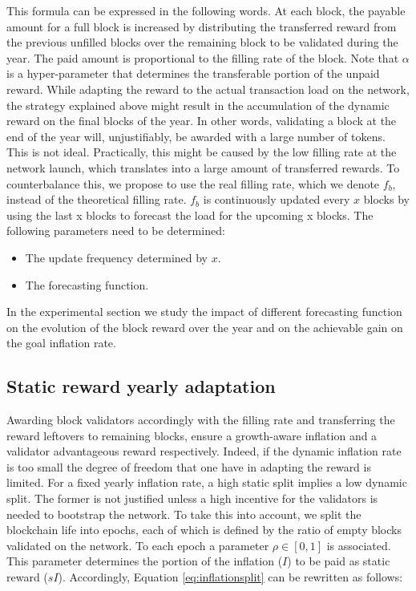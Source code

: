 \documentclass[conference]{IEEEtran}
\begin{document}
This formula can be expressed in the following words. At each block, the payable amount for a full block is increased by distributing the transferred reward from the previous unfilled blocks over the remaining block to be validated during the year. The paid amount is proportional to the filling rate of the block. Note that $\alpha$ is a hyper-parameter that determines the transferable portion of the unpaid reward. While adapting the reward to the actual transaction load on the network, the strategy explained above might result in the accumulation of the dynamic reward on the final blocks of the year. In other words, validating a block at the end of the year will, unjustifiably, be awarded with a large number of tokens. This is not ideal. Practically, this might be caused by the low filling rate at the network launch, which translates into a large amount of transferred rewards. To counterbalance this, we propose to use the real filling rate, which we denote $f_b$, instead of the theoretical filling rate. $f_b$ is continuously updated every $x$ blocks by using the last x blocks to forecast the load for the upcoming x blocks. The following parameters need to be determined:

\begin{itemize}
	\item The update frequency determined by $x$.
	\item The forecasting function.
\end{itemize}

In the experimental section we study the impact of different forecasting function on the evolution of the block reward over the year and on the achievable gain on the goal inflation rate.

\subsection{Static reward yearly adaptation}
Awarding block validators accordingly with the filling rate and transferring the reward leftovers to remaining blocks, ensure a growth-aware inflation and a validator advantageous reward respectively. Indeed, if the dynamic inflation rate is too small the degree of freedom that one have in adapting the reward is limited. For a fixed yearly inflation rate, a high static split implies a low dynamic split. The former is not justified unless a high incentive for the validators is needed to bootstrap the network. To take this into account, we split the blockchain life into epochs, each of which is defined by the ratio of empty blocks validated on the network. To each epoch a parameter $\rho \in [0, 1]$ is associated. This parameter determines the portion of the inflation ($I$) to be paid as static reward ($sI$). Accordingly, Equation \ref{eq:inflationsplit} can be rewritten as follows:
\end{document}
